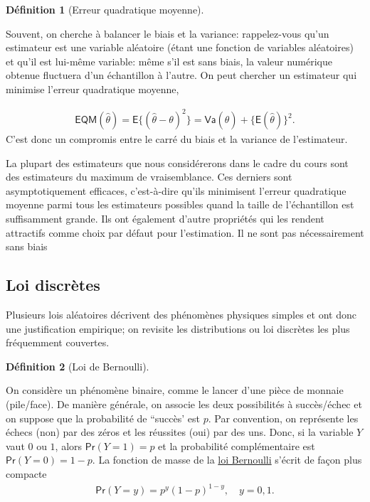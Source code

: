 \documentclass[
  11pt,
  letterpaper,
]{scrbook}
\theoremstyle{definition}
\theoremstyle{definition}
\newtheorem{definition}{Définition}[chapter]
\theoremstyle{remark}
\begin{document}
\begin{definition}[Erreur quadratique
moyenne]\protect\hypertarget{def-eqm}{}\label{def-eqm}

Souvent, on cherche à balancer le biais et la variance: rappelez-vous
qu'un estimateur est une variable aléatoire (étant une fonction de
variables aléatoires) et qu'il est lui-même variable: même s'il est sans
biais, la valeur numérique obtenue fluctuera d'un échantillon à l'autre.
On peut chercher un estimateur qui minimise l'erreur quadratique
moyenne,

\begin{align*}
\mathsf{EQM}(\hat{\theta}) = \mathsf{E}\{(\hat{\theta}-\theta)^2\}=\mathsf{Va}(\hat{\theta}) + \{\mathsf{E}(\hat{\theta})\}^2.
\end{align*} C'est donc un compromis entre le carré du biais et la
variance de l'estimateur.

\end{definition}

La plupart des estimateurs que nous considérerons dans le cadre du cours
sont des estimateurs du maximum de vraisemblance. Ces derniers sont
asymptotiquement efficaces, c'est-à-dire qu'ils minimisent l'erreur
quadratique moyenne parmi tous les estimateurs possibles quand la taille
de l'échantillon est suffisamment grande. Ils ont également d'autre
propriétés qui les rendent attractifs comme choix par défaut pour
l'estimation. Il ne sont pas nécessairement sans biais

\subsection{Loi discrètes}\label{loi-discruxe8tes}

Plusieurs lois aléatoires décrivent des phénomènes physiques simples et
ont donc une justification empirique; on revisite les distributions ou
loi discrètes les plus fréquemment couvertes.

\begin{definition}[Loi de
Bernoulli]\protect\hypertarget{def-loibern}{}\label{def-loibern}

On considère un phénomène binaire, comme le lancer d'une pièce de
monnaie (pile/face). De manière générale, on associe les deux
possibilités à succès/échec et on suppose que la probabilité de
``succès' est \(p\). Par convention, on représente les échecs (non) par
des zéros et les réussites (oui) par des uns. Donc, si la variable \(Y\)
vaut \(0\) ou \(1\), alors \(\mathsf{Pr}(Y=1)=p\) et la probabilité
complémentaire est \(\mathsf{Pr}(Y=0)=1-p\). La fonction de masse de la
\href{https://fr.wikipedia.org/wiki/Loi_de_Bernoulli}{loi Bernoulli}
s'écrit de façon plus compacte \begin{align*}
\mathsf{Pr}(Y=y) = p^y (1-p)^{1-y}, \quad y=0, 1.
\end{align*}

\end{definition}
\end{document}
